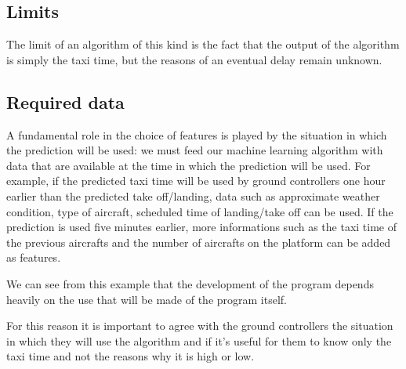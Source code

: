 \documentclass{article}
\begin{document}
\subsection{Limits}
The limit of an algorithm of this kind is the fact that the output of the algorithm is simply the taxi time, but the reasons of an eventual delay remain unknown.

\subsection{Required data}
A fundamental role in the choice of features is played by the situation in which the prediction will be used: we must feed our machine learning algorithm with data that are available at the time in which the prediction will be used. For example, if the predicted taxi time will be used by ground controllers one hour earlier than the predicted take off/landing, data such as approximate weather condition, type of aircraft, scheduled time of landing/take off can be used.
If the prediction is used five minutes earlier, more informations such as the taxi time of the previous aircrafts and the number of aircrafts on the platform can be added as features.

We can see from this example that the development of the program depends heavily on the use that will be made of the program itself.

For this reason it is important to agree with the ground controllers the situation in which they will use the algorithm and if it's useful for them to know only the taxi time and not the reasons why it is high or low. 
\end{document}
